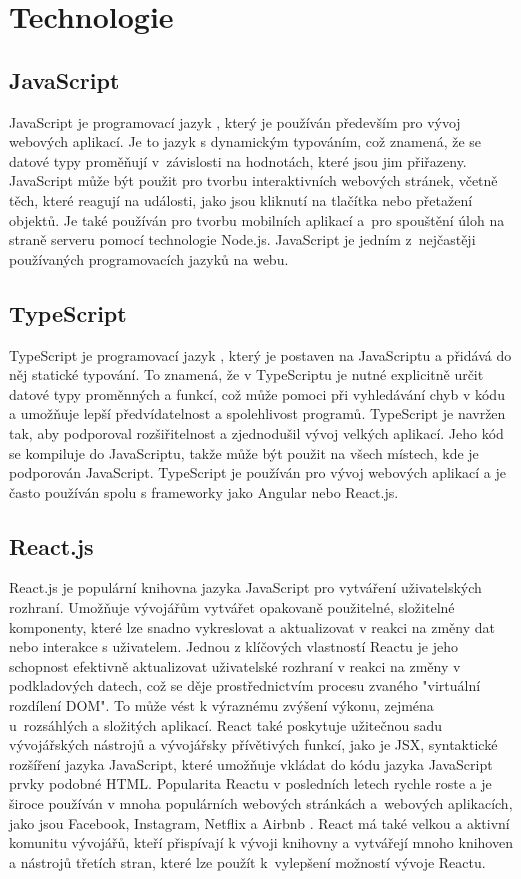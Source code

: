 \section{Technologie}

\subsection{JavaScript}

JavaScript je programovací jazyk \cite{javascript}, který je používán především pro vývoj webových aplikací.  Je to jazyk s dynamickým typováním, což znamená, že se datové typy proměňují v~závislosti na hodnotách, které jsou jim přiřazeny. JavaScript může být použit pro tvorbu interaktivních webových stránek, včetně těch, které reagují na události, jako jsou kliknutí na tlačítka nebo přetažení objektů. Je také používán pro tvorbu mobilních aplikací a~pro spouštění úloh na straně serveru pomocí technologie Node.js. JavaScript je jedním z~nejčastěji používaných programovacích jazyků na webu.

\subsection{TypeScript}
TypeScript je programovací jazyk \cite{typescript}, který je postaven na JavaScriptu a přidává do něj statické typování. To znamená, že v TypeScriptu je nutné explicitně určit datové typy proměnných a funkcí, což může pomoci při vyhledávání chyb v kódu a umožňuje lepší předvídatelnost a spolehlivost programů. TypeScript je navržen tak, aby podporoval rozšiřitelnost a zjednodušil vývoj velkých aplikací. Jeho kód se kompiluje do JavaScriptu, takže může být použit na všech místech, kde je podporován JavaScript. TypeScript je používán pro vývoj webových aplikací a je často používán spolu s frameworky jako Angular nebo React.js.
\subsection{React.js}\label{reactjs}
React.js je populární knihovna jazyka JavaScript pro vytváření uživatelských rozhraní. Umožňuje vývojářům vytvářet opakovaně použitelné, složitelné komponenty, které lze snadno vykreslovat a aktualizovat v reakci na změny dat nebo interakce s uživatelem. Jednou z klíčových vlastností Reactu je jeho schopnost efektivně aktualizovat uživatelské rozhraní v reakci na změny v podkladových datech, což se děje prostřednictvím procesu zvaného "virtuální rozdílení DOM". To může vést k výraznému zvýšení výkonu, zejména u~rozsáhlých a složitých aplikací. React také poskytuje užitečnou sadu vývojářských nástrojů a vývojářsky přívětivých funkcí, jako je JSX, syntaktické rozšíření jazyka JavaScript, které umožňuje vkládat do kódu jazyka JavaScript prvky podobné HTML. Popularita Reactu v posledních letech rychle roste a je široce používán v mnoha populárních webových stránkách a~webových aplikacích, jako jsou Facebook, Instagram, Netflix a Airbnb \cite{reactUsers}. React má také velkou a aktivní komunitu vývojářů, kteří přispívají k vývoji knihovny a vytvářejí mnoho knihoven a nástrojů třetích stran, které lze použít k~vylepšení možností vývoje Reactu.
